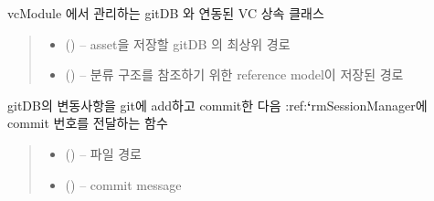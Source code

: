 \documentclass[a4paper,10pt,english]{sphinxmanual}
\begin{document}
\begin{fulllineitems}
\label{\detokenize{_VersionController:publishVC}}
\pysigstartsignatures
{}
\pysigstopsignatures
\sphinxAtStartPar
vcModule 에서 관리하는 gitDB 와 연동된 VC 상속 클래스
\begin{quote}\begin{description}
\begin{itemize}
\item {} 
\sphinxAtStartPar
{} () – asset을 저장할 gitDB 의 최상위 경로

\item {} 
\sphinxAtStartPar
{} () – 분류 구조를 참조하기 위한 reference model이 저장된 경로

\end{itemize}

\end{description}\end{quote}

\begin{fulllineitems}
\label{\detokenize{_VersionController:publishVC.commit}}
\pysigstartsignatures
{}
\pysigstopsignatures
\sphinxAtStartPar
gitDB의 변동사항을 git에 add하고 commit한 다음 :ref:{\color{red}\bfseries{}`}rmSessionManager에 commit 번호를 전달하는 함수
\begin{quote}\begin{description}
\begin{itemize}
\item {} 
\sphinxAtStartPar
{} () – 파일 경로

\item {} 
\sphinxAtStartPar
{} () – commit message


\end{itemize}
\end{description}
\end{quote}
\end{fulllineitems}
\end{fulllineitems}
\end{document}
